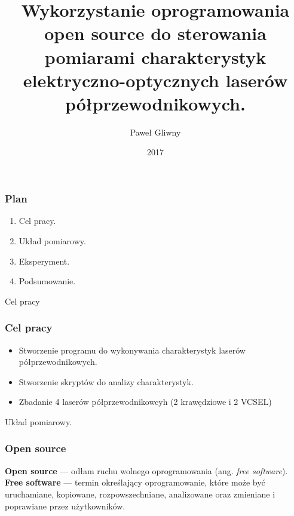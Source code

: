 \documentclass[xcolor={dvipsnames,table}]{beamer}
\title{Wykorzystanie oprogramowania open source do sterowania pomiarami charakterystyk elektryczno-optycznych laserów półprzewodnikowych.}
\author{Paweł Gliwny}
\institute{Instytut Fizyki \\ Politechnika Łódzka}
\date{2017}
\begin{document}
\frame{\titlepage}


\begin{frame}
\frametitle{Plan}
\begin{enumerate}
\item Cel pracy.
\item Układ pomiarowy.
\item Eksperyment.
\item Podsumowanie.
\end{enumerate}
\end{frame}

\begin{frame}
\begin{Huge}
\begin{center}
Cel pracy
\end{center}
\end{Huge}
\end{frame}

\begin{frame}
\frametitle{Cel pracy}
\begin{itemize}
\item Stworzenie programu do wykonywania charakterystyk laserów półprzewodnikowych.
\item Stworzenie skryptów do analizy charakterystyk.
\item Zbadanie 4 laserów półprzewodnikowcyh (2 krawędziowe i 2 VCSEL)
\end{itemize}
\end{frame}

\begin{frame}
\begin{Huge}
\begin{center}
Układ pomiarowy.
\end{center}
\end{Huge}
\end{frame}

\begin{frame}
\frametitle{Open source}
{\bf{Open source}} --- odłam ruchu wolnego oprogramowania (ang. \textit{free software}). \\
{\bf{Free software}} ---  termin określający oprogramowanie, które może być uruchamiane, kopiowane, rozpowszechniane, analizowane oraz zmieniane i poprawiane przez  użytkowników. 
\end{frame}
\end{document}
